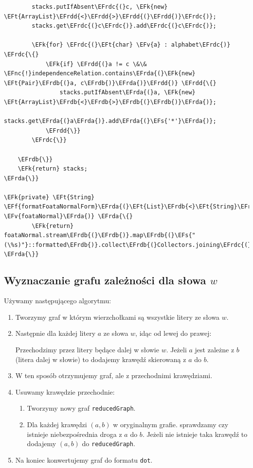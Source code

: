 \documentclass[11pt]{article}
\newcommand{\EFs}[1]{\textcolor{EFs}{#1}} %
\newcommand{\EFk}[1]{\textcolor{EFk}{#1}} %
\newcommand{\EFf}[1]{\textcolor{EFf}{#1}} %
\newcommand{\EFv}[1]{\textcolor{EFv}{#1}} %
\newcommand{\EFt}[1]{\textcolor{EFt}{#1}} %
\newcommand{\EFnc}[1]{\textcolor{EFnc}{\textbf{#1}}} %
\newcommand{\EFrda}[1]{#1} %
\newcommand{\EFrdb}[1]{\textcolor{EFrdb}{#1}} %
\newcommand{\EFrdc}[1]{\textcolor{EFrdc}{#1}} %
\newcommand{\EFrdd}[1]{\textcolor{EFrdd}{#1}} %
\begin{document}
\begin{Code}
\begin{Verbatim}
        stacks.putIfAbsent\EFrdc{(}c, \EFk{new} \EFt{ArrayList}\EFrdd{<}\EFrdd{>}\EFrdd{(}\EFrdd{)}\EFrdc{)};
        stacks.get\EFrdc{(}c\EFrdc{)}.add\EFrdc{(}c\EFrdc{)};

        \EFk{for} \EFrdc{(}\EFt{char} \EFv{a} : alphabet\EFrdc{)} \EFrdc{\{}
            \EFk{if} \EFrdd{(}a != c \&\& \EFnc{!}independenceRelation.contains\EFrda{(}\EFk{new} \EFt{Pair}\EFrdb{(}a, c\EFrdb{)}\EFrda{)}\EFrdd{)} \EFrdd{\{}
                stacks.putIfAbsent\EFrda{(}a, \EFk{new} \EFt{ArrayList}\EFrdb{<}\EFrdb{>}\EFrdb{(}\EFrdb{)}\EFrda{)};
                stacks.get\EFrda{(}a\EFrda{)}.add\EFrda{(}\EFs{'*'}\EFrda{)};
            \EFrdd{\}}
        \EFrdc{\}}

    \EFrdb{\}}
    \EFk{return} stacks;
\EFrda{\}}

\EFk{private} \EFt{String} \EFf{formatFoataNormalForm}\EFrda{(}\EFt{List}\EFrdb{<}\EFt{String}\EFrdb{>} \EFv{foataNormal}\EFrda{)} \EFrda{\{}
        \EFk{return} foataNormal.stream\EFrdb{(}\EFrdb{)}.map\EFrdb{(}\EFs{"(\%s)"}::formatted\EFrdb{)}.collect\EFrdb{(}Collectors.joining\EFrdc{(}\EFrdc{)}\EFrdb{)};
\EFrda{\}}
\end{Verbatim}
\end{Code}
\subsection*{Wyznaczanie grafu zależności dla słowa \(w\)}
\label{sec:org42aee9f}
Używamy następującego algorytmu:
\begin{enumerate}
\item Tworzymy graf w którym wierzchołkami są wszystkie litery ze słowa \(w\).
\item Następnie dla każdej litery \(a\) ze słowa \(w\), idąc od lewej do prawej:

Przechodzimy przez litery będące dalej w słowie \(w\).
Jeżeli \(a\) jest zależne z \(b\)(litera dalej w słowie) to dodajemy krawędź skierowaną z \(a\) do \(b\).
\item W ten sposób otrzymujemy graf, ale z przechodnimi krawędziami.
\item Usuwamy krawędzie przechodnie:
\begin{enumerate}
\item Tworzymy nowy graf \texttt{reducedGraph}.
\item Dla każdej krawędzi \((a,b)\) w oryginalnym grafie.
sprawdzamy czy istnieje
niebezpośrednia droga z \(a\) do \(b\).
Jeżeli nie istnieje taka krawędź to dodajemy \((a,b)\) do \texttt{reducedGraph}.
\end{enumerate}
\item Na koniec konwertujemy graf do formatu \texttt{dot}.
\end{enumerate}
\end{document}
